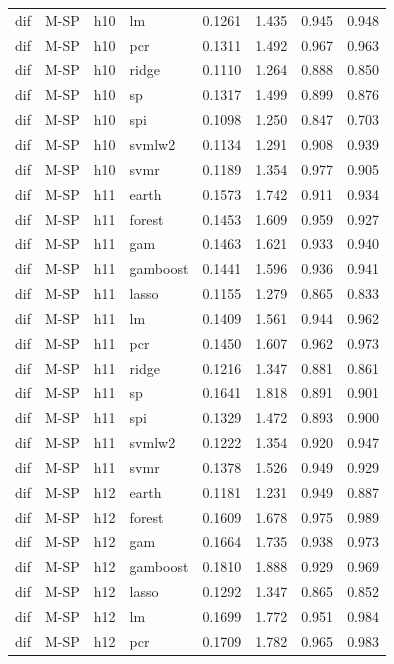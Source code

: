 \begin{ThreePartTable}
\begin{longtable}[t]{llclcccc}
dif & M-SP & h10 & lm & 0.1261 & 1.435 & 0.945 & 0.948\\
dif & M-SP & h10 & pcr & 0.1311 & 1.492 & 0.967 & 0.963\\
dif & M-SP & h10 & ridge & 0.1110 & 1.264 & 0.888 & 0.850\\
dif & M-SP & h10 & sp & 0.1317 & 1.499 & 0.899 & 0.876\\
dif & M-SP & h10 & spi & 0.1098 & 1.250 & 0.847 & 0.703\\
dif & M-SP & h10 & svmlw2 & 0.1134 & 1.291 & 0.908 & 0.939\\
dif & M-SP & h10 & svmr & 0.1189 & 1.354 & 0.977 & 0.905\\
\addlinespace
dif & M-SP & h11 & earth & 0.1573 & 1.742 & 0.911 & 0.934\\
dif & M-SP & h11 & forest & 0.1453 & 1.609 & 0.959 & 0.927\\
dif & M-SP & h11 & gam & 0.1463 & 1.621 & 0.933 & 0.940\\
dif & M-SP & h11 & gamboost & 0.1441 & 1.596 & 0.936 & 0.941\\
dif & M-SP & h11 & lasso & 0.1155 & 1.279 & 0.865 & 0.833\\
dif & M-SP & h11 & lm & 0.1409 & 1.561 & 0.944 & 0.962\\
dif & M-SP & h11 & pcr & 0.1450 & 1.607 & 0.962 & 0.973\\
dif & M-SP & h11 & ridge & 0.1216 & 1.347 & 0.881 & 0.861\\
dif & M-SP & h11 & sp & 0.1641 & 1.818 & 0.891 & 0.901\\
dif & M-SP & h11 & spi & 0.1329 & 1.472 & 0.893 & 0.900\\
dif & M-SP & h11 & svmlw2 & 0.1222 & 1.354 & 0.920 & 0.947\\
dif & M-SP & h11 & svmr & 0.1378 & 1.526 & 0.949 & 0.929\\
\addlinespace
dif & M-SP & h12 & earth & 0.1181 & 1.231 & 0.949 & 0.887\\
dif & M-SP & h12 & forest & 0.1609 & 1.678 & 0.975 & 0.989\\
dif & M-SP & h12 & gam & 0.1664 & 1.735 & 0.938 & 0.973\\
dif & M-SP & h12 & gamboost & 0.1810 & 1.888 & 0.929 & 0.969\\
dif & M-SP & h12 & lasso & 0.1292 & 1.347 & 0.865 & 0.852\\
dif & M-SP & h12 & lm & 0.1699 & 1.772 & 0.951 & 0.984\\
dif & M-SP & h12 & pcr & 0.1709 & 1.782 & 0.965 & 0.983\\

\end{longtable}
\end{ThreePartTable}
